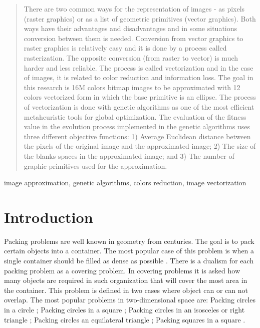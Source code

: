 \documentclass[conference]{IEEEtran}
\begin{document}
\maketitle

\begin{abstract}
There are two common ways for the representation of images - as pixels (raster graphics) or as a list of geometric primitives (vector graphics). Both ways have their advantages and disadvantages and in some situations conversion between them is needed. Conversion from vector graphics to raster graphics is relatively easy and it is done by a process called rasterization. The opposite conversion (from raster to vector) is much harder and less reliable. The process is called vectorization and in the case of images, it is related to color reduction and information loss. The goal in this research is 16M colors bitmap images to be approximated with 12 colors vectorized form in which the base primitive is an ellipse. The process of vectorization is done with genetic algorithms as one of the most efficient metaheuristic tools for global optimization. The evaluation of the fitness value in the evolution process implemented in the genetic algorithms uses three different objective functions: 1) Average Euclidean distance between the pixels of the original image and the approximated image; 2) The size of the blanks spaces in the approximated image; and 3) The number of graphic primitives used for the approximation. 
\end{abstract}

\begin{IEEEkeywords}
image approximation, genetic algorithms, colors reduction, image vectorization
\end{IEEEkeywords}

\section{Introduction}

Packing problems are well known in geometry from centuries. The goal is to pack certain objects into a container. The most popular case of this problem is when a single container should be filled as dense as possible \cite{Lodi-Martello-Monaci-2002}. There is a dualism for each packing problem as a covering problem. In covering problems it is asked how many objects are required in such organization that will cover the most area in the container. This problem is defined in two cases where object can or can not overlap. The most popular problems in two-dimensional space are: Packing circles in a circle \cite{Fodor-2003}; Packing circles in a square \cite{Huang-Ye-2010}; Packing circles in an isosceles or right triangle \cite{Xu-1996}; Packing circles an equilateral triangle \cite{Nurmela-2000}; Packing squares in a square \cite{Stromquist-2003}.
\end{document}
